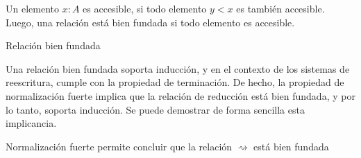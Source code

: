 Un elemento $x: A$ es accesible, si todo elemento $y < x$ es también accesible.
Luego, una relación está bien fundada si todo elemento es accesible.

\begin{codigo}
	Relación bien fundada
\end{codigo}

Una relación bien fundada soporta inducción, y en el contexto de los sistemas de reescritura, cumple con la propiedad de terminación.
De hecho, la propiedad de normalización fuerte implica que la relación de reducción está bien fundada, y por lo tanto, soporta inducción.
Se puede demostrar de forma sencilla esta implicancia.

\begin{codigo}
	Normalización fuerte permite concluir que la relación $\rightsquigarrow$ está bien fundada
\end{codigo} 

